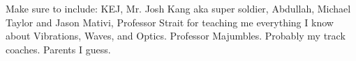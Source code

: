 
Make sure to include:
KEJ, Mr. Josh Kang aka super soldier, Abdullah, Michael Taylor and Jason Mativi, Professor Strait for teaching me everything I know about Vibrations, Waves, and Optics.  
Professor Majumbles. Probably my track coaches. Parents I guess.


